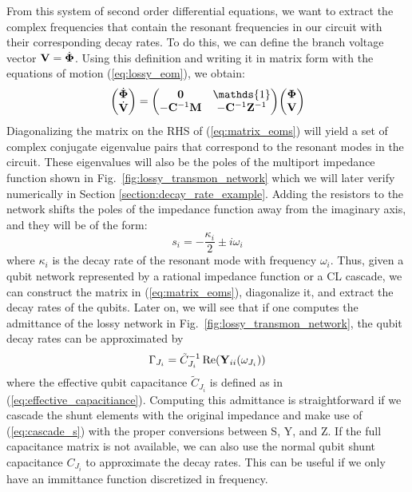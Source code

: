 From this system of second order differential equations, we want to extract the complex frequencies that contain the resonant frequencies in our circuit with their corresponding decay rates. To do this, we can define the branch voltage vector $\vb{V} = \dot{\vb{\Phi}}$. Using this definition and writing it in matrix form with the equations of motion (\ref{eq:lossy_eom}), we obtain:
\begin{equation}\label{eq:matrix_eoms}
    \mqty( \dot{\vb{\Phi}}  \\ \dot{\vb{V}} ) = \mqty( \vb{0} & \mathds{1} \\ -\vb{C}^{-1}\vb{M} & -\vb{C}^{-1}\vb{Z}^{-1} ) \mqty( \vb{\Phi}  \\ \vb{V} )
\end{equation} 
Diagonalizing the matrix on the RHS of (\ref{eq:matrix_eoms}) will yield a set of complex conjugate eigenvalue pairs that correspond to the resonant modes in the circuit. These eigenvalues will also be the poles of the multiport impedance function shown in Fig.\ \ref{fig:lossy_transmon_network} which we will later verify numerically in Section \ref{section:decay_rate_example}. Adding the resistors to the network shifts the poles of the impedance function away from the imaginary axis, and they will be of the form:
\begin{equation}\label{eq:lossy_pole}
    s_i = -\frac{\kappa_i}{2} \pm i\omega_i
\end{equation}
where $\kappa_i$ is the decay rate of the resonant mode with frequency $\omega_i$. Thus, given a qubit network represented by a rational impedance function or a CL cascade, we can construct the matrix in (\ref{eq:matrix_eoms}), diagonalize it, and extract the decay rates of the qubits. Later on, we will see that if one computes the admittance of the lossy network in Fig.\ \ref{fig:lossy_transmon_network}, the qubit decay rates can be approximated by 
\begin{equation}\label{eq:qubit_decay_admittance}
    \Gamma_{J_i} = \tilde{C}_{J_i}^{-1} \operatorname{Re}(\vb{Y}_{ii}(\omega_{J_i}))
\end{equation}
where the effective qubit capacitance $\tilde{C}_{J_i}$ is defined as in (\ref{eq:effective_capacitiance}). Computing this admittance is straightforward if we cascade the shunt elements with the original impedance and make use of (\ref{eq:cascade_s}) with the proper conversions between S, Y, and Z. If the full capacitance matrix is not available, we can also use the normal qubit shunt capacitance $C_{J_i}$ to approximate the decay rates. This can be useful if we only have an immittance function discretized in frequency.